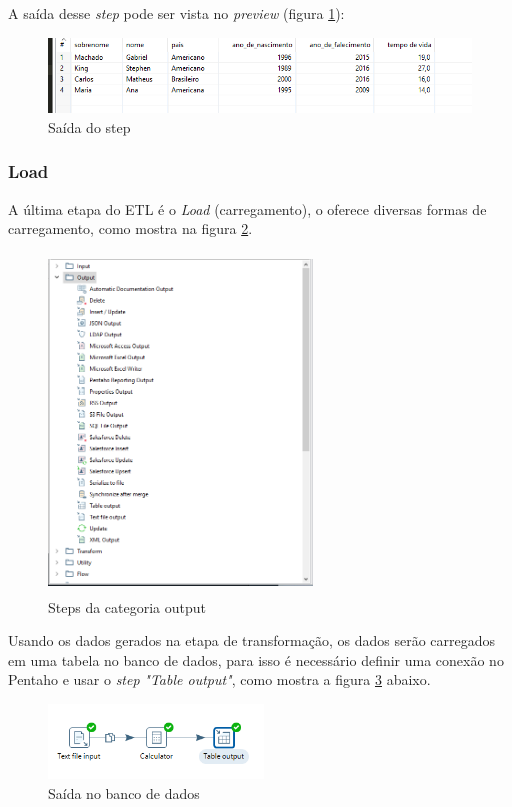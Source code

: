 A saída desse \textit{step} pode ser vista no \textit{preview} (figura \ref{preview}):
\begin{figure}[H]
\centering
\includegraphics[height=2cm]{imagens/saidavida.png}
\caption{Saída do step}
\label{preview}
\end{figure}
\subsubsection{Load}
A última etapa do ETL é o \textit{Load} (carregamento), o \pdi oferece diversas formas de carregamento, como mostra na figura \ref{outputsteps}.
\begin{figure}[H]
\centering
\includegraphics[width=7cm, height=9cm]{imagens/output.png}
\caption{Steps da categoria output}
\label{outputsteps}
\end{figure}
Usando os dados gerados na etapa de transformação, os dados serão carregados em uma tabela no banco de dados, para isso é necessário definir uma conexão no Pentaho e usar o \textit{step} \textit{"Table output"}, como mostra a figura \ref{outputstep} abaixo.
\begin{figure}[H]
\centering
\includegraphics[height=2cm]{imagens/tableoutput.png}
\caption{Saída no banco de dados}
\label{outputstep}
\end{figure}
